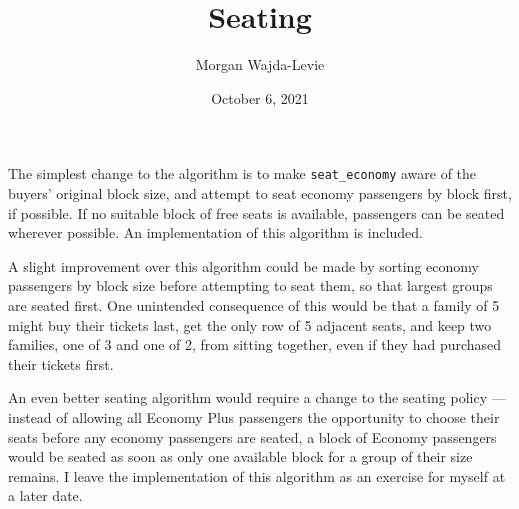 \documentclass{article}
\author{Morgan Wajda-Levie}
\date{October 6, 2021}
\title{Seating}
\begin{document}
\maketitle

The simplest change to the algorithm is to make \texttt{seat\_economy}
aware of the buyers' original block size, and attempt to seat economy
passengers by block first, if possible. If no suitable block of free
seats is available, passengers can be seated wherever possible. An
implementation of this algorithm is included.

A slight improvement over this algorithm could be made by sorting
economy passengers by block size before attempting to seat them, so that
largest groups are seated first. One unintended consequence of this
would be that a family of 5 might buy their tickets last, get the only
row of 5 adjacent seats, and keep two families, one of 3 and one of 2,
from sitting together, even if they had purchased their tickets first.

An even better seating algorithm would require a change to the seating
policy --- instead of allowing all Economy Plus passengers the
opportunity to choose their seats before any economy passengers are
seated, a block of Economy passengers would be seated as soon as only
one available block for a group of their size remains. I leave the
implementation of this algorithm as an exercise for myself at a later
date.
\end{document}

